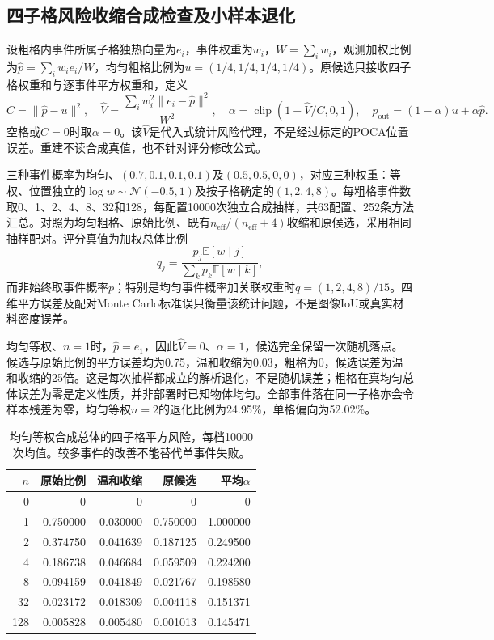 \documentclass[UTF8,fontset=none,zihao=-4,a4paper]{ctexart}
\begin{document}
\subsection{四子格风险收缩合成检查及小样本退化}
设粗格内事件所属子格独热向量为$e_i$，事件权重为$w_i$，$W=\sum_iw_i$，观测加权比例为$\hat p=\sum_iw_ie_i/W$，均匀粗格比例为$u=(1/4,1/4,1/4,1/4)$。原候选只接收四子格权重和与逐事件平方权重和，定义
\begin{equation}
C=\|\hat p-u\|^2,\quad
\hat V=\frac{\sum_iw_i^2\|e_i-\hat p\|^2}{W^2},\quad
\alpha=\operatorname{clip}(1-\hat V/C,0,1),\quad
p_{\mathrm{out}}=(1-\alpha)u+\alpha\hat p.
\end{equation}
空格或$C=0$时取$\alpha=0$。该$\hat V$是代入式统计风险代理，不是经过标定的POCA位置误差。重建不读合成真值，也不针对评分修改公式。

三种事件概率为均匀、$(0.7,0.1,0.1,0.1)$及$(0.5,0.5,0,0)$，对应三种权重：等权、位置独立的$\log w\sim\mathcal N(-0.5,1)$及按子格确定的$(1,2,4,8)$。每粗格事件数取0、1、2、4、8、32和128，每配置10000次独立合成抽样，共63配置、252条方法汇总。对照为均匀粗格、原始比例、既有$n_{\mathrm{eff}}/(n_{\mathrm{eff}}+4)$收缩和原候选，采用相同抽样配对。评分真值为加权总体比例
\begin{equation}
q_j=\frac{p_j\mathbb E[w\mid j]}{\sum_kp_k\mathbb E[w\mid k]},
\end{equation}
而非始终取事件概率$p$；特别是均匀事件概率加关联权重时$q=(1,2,4,8)/15$。四维平方误差及配对Monte Carlo标准误只衡量该统计问题，不是图像IoU或真实材料密度误差。

均匀等权、$n=1$时，$\hat p=e_1$，因此$\hat V=0$、$\alpha=1$，候选完全保留一次随机落点。候选与原始比例的平方误差均为0.75，温和收缩为0.03，粗格为0，候选误差为温和收缩的25倍。这是每次抽样都成立的解析退化，不是随机误差；粗格在真均匀总体误差为零是定义性质，并非部署时已知物体均匀。全部事件落在同一子格亦会令样本残差为零，均匀等权$n=2$的退化比例为24.95\%，单格偏向为52.02\%。

\begin{table}[H]
\centering
\caption{均匀等权合成总体的四子格平方风险，每档10000次均值。较多事件的改善不能替代单事件失败。}
\label{tab:synthetic-subcell-risk}
\begin{tabular}{rrrrr}
\toprule
$n$ & 原始比例 & 温和收缩 & 原候选 & 平均$\alpha$\\
\midrule
0 & 0 & 0 & 0 & 0\\
1 & 0.750000 & 0.030000 & 0.750000 & 1.000000\\
2 & 0.374750 & 0.041639 & 0.187125 & 0.249500\\
4 & 0.186738 & 0.046684 & 0.059509 & 0.224200\\
8 & 0.094159 & 0.041849 & 0.021767 & 0.198580\\
32 & 0.023172 & 0.018309 & 0.004118 & 0.151371\\
128 & 0.005828 & 0.005480 & 0.001013 & 0.145471\\
\bottomrule
\end{tabular}
\end{table}
\end{document}
